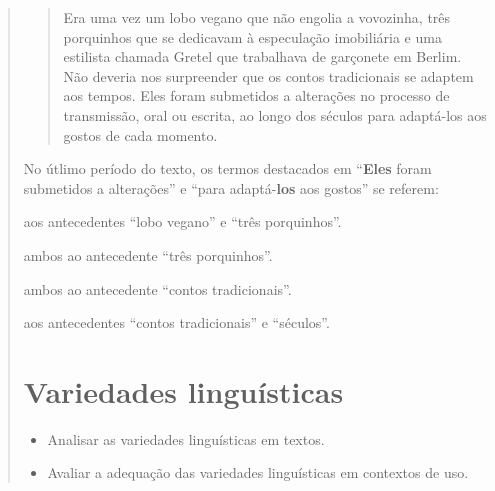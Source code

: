 \begin{quote}
{\begin{quote}

Era uma vez um lobo vegano que não engolia a vovozinha, três
porquinhos que se dedicavam à especulação imobiliária e uma estilista
chamada Gretel que trabalhava de garçonete em Berlim. Não deveria nos
surpreender que os contos tradicionais se adaptem aos tempos. Eles foram
submetidos a alterações no processo de transmissão, oral ou escrita, ao
longo dos séculos para adaptá-los aos gostos de cada momento.

\end{quote}


No útlimo período do texto, os termos destacados em ``\textbf{Eles} foram
submetidos a alterações'' e ``para adaptá-\textbf{los} aos gostos'' se referem:

\begin{escolha}

  \item aos antecedentes ``lobo vegano'' e ``três porquinhos''.

  \item ambos ao antecedente ``três porquinhos''. 

  \item ambos ao antecedente ``contos tradicionais''.

  \item aos antecedentes ``contos tradicionais'' e ``séculos''.

\end{escolha}


\chapter{Variedades linguísticas}


\begin{itemize}

  \item Analisar as variedades linguísticas em textos.

  \item Avaliar a adequação das variedades linguísticas em contextos de uso.

\end{itemize}

}
\end{quote}
